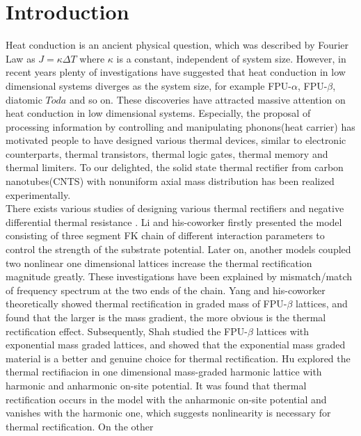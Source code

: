 \documentclass[pra,preprint,superscriptaddress,showkeys,showpacs]{revtex4}
\begin{document}
\section {Introduction}
\indent Heat conduction is an ancient physical question, which was
described by Fourier Law as $J=\kappa{\Delta T}$ where $\kappa$ is a
constant, independent of system size. However, in recent years
plenty of investigations have suggested that heat conduction in low
dimensional systems diverges as the system size, for example
FPU-$\alpha$, FPU-$\beta$, diatomic $Toda$ and so on\cite{a1}. These
discoveries have attracted massive attention on heat conduction in
low dimensional systems. Especially, the proposal\cite{a2} of
processing information by controlling and manipulating phonons(heat
carrier) has motivated people to have designed various thermal
devices, similar to electronic counterparts, thermal
transistors\cite{a3}, thermal logic gates\cite{a4}, thermal
memory\cite{a5} and thermal limiters\cite{a6}. To our delighted, the
solid state thermal rectifier from carbon nanotubes(CNTS) with
nonuniform axial mass distribution has been realized
experimentally\cite{a7}.\\
\indent There exists various studies of designing various thermal
rectifiers and negative differential thermal resistance \cite{a8,a9,a10,a11,a12,a13,a14,a15,a16,a17,a18,a19,a20,a21,a22,a23,a24,a25}.
 Li and his-coworker firstly presented the model\cite{a8} consisting of three segment FK
chain of different interaction parameters to control the strength of
the substrate potential. Later on, another models\cite{a9,a10}
coupled two nonlinear one dimensional lattices increase the thermal
rectification magnitude greatly. These investigations have been
explained by mismatch/match of frequency spectrum at the two ends of
the chain. Yang and his-coworker\cite{a19} theoretically showed
thermal rectification in graded mass of FPU-$\beta$ lattices, and
found that the larger is the mass gradient, the more obvious is the
thermal rectification effect. Subsequently, Shah\cite{a20} studied
the FPU-$\beta$ lattices with exponential mass graded lattices, and
showed that the exponential mass graded material is a better and
genuine choice for thermal rectification. Hu\cite{a21} explored the
thermal rectifiacion in one dimensional mass-graded harmonic lattice
with harmonic and anharmonic on-site potential. It was found that
thermal rectification occurs in the model with the anharmonic
on-site potential and vanishes with the harmonic one, which suggests
nonlinearity is necessary for thermal rectification. On the other
\end{document}
